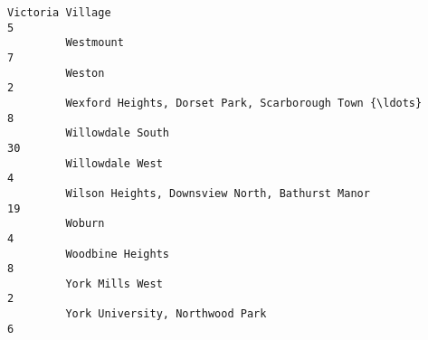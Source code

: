 \documentclass[11pt]{article}
\begin{document}
\begin{Verbatim}[commandchars=\\\{\}]
         Victoria Village                                                        5   
         Westmount                                                               7   
         Weston                                                                  2   
         Wexford Heights, Dorset Park, Scarborough Town {\ldots}                      8   
         Willowdale South                                                       30   
         Willowdale West                                                         4   
         Wilson Heights, Downsview North, Bathurst Manor                        19   
         Woburn                                                                  4   
         Woodbine Heights                                                        8   
         York Mills West                                                         2   
         York University, Northwood Park                                         6   
         

\end{Verbatim}
\end{document}
